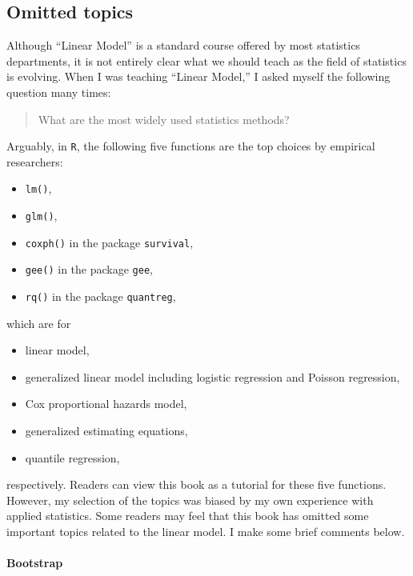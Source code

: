\subsection*{Omitted topics}



Although ``Linear Model'' is a standard course offered by most statistics departments, it is not entirely clear what we should teach as the field of statistics is evolving. When I was teaching ``Linear Model,'' I asked myself the following question many times: 
\begin{quote}
What are the most widely used statistics methods? 
\end{quote}
Arguably, in \texttt{R}, the following five functions are the top choices by empirical researchers:
\begin{itemize}
\item
\texttt{lm()},
\item
\texttt{glm()},
\item
\texttt{coxph()} in the package \texttt{survival},
\item
\texttt{gee()} in the package \texttt{gee},
\item
\texttt{rq()} in the package \texttt{quantreg},
\end{itemize}
which are for
\begin{itemize}
\item
linear model,
\item
generalized linear model including logistic regression and Poisson regression,
\item
Cox proportional hazards model,
\item
generalized estimating equations,
\item
quantile regression,
\end{itemize}
respectively. Readers can view this book as a tutorial for these five functions. However, my selection of the topics was biased by my own experience with applied statistics. Some readers may feel that this book has omitted some important topics related to the linear model. I make some brief comments below.    



\paragraph*{Bootstrap}

